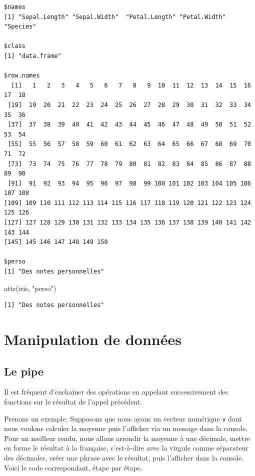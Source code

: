 \documentclass[
  letterpaper,
  DIV=11,
  numbers=noendperiod,
  oneside]{scrreprt}
\newenvironment{Shaded}{\begin{snugshade}}{\end{snugshade}}
\newcommand{\FunctionTok}[1]{\textcolor[rgb]{0.28,0.35,0.67}{#1}}
\newcommand{\NormalTok}[1]{\textcolor[rgb]{0.00,0.23,0.31}{#1}}
\newcommand{\StringTok}[1]{\textcolor[rgb]{0.13,0.47,0.30}{#1}}
\begin{document}
\begin{verbatim}
$names
[1] "Sepal.Length" "Sepal.Width"  "Petal.Length" "Petal.Width"  "Species"     

$class
[1] "data.frame"

$row.names
  [1]   1   2   3   4   5   6   7   8   9  10  11  12  13  14  15  16  17  18
 [19]  19  20  21  22  23  24  25  26  27  28  29  30  31  32  33  34  35  36
 [37]  37  38  39  40  41  42  43  44  45  46  47  48  49  50  51  52  53  54
 [55]  55  56  57  58  59  60  61  62  63  64  65  66  67  68  69  70  71  72
 [73]  73  74  75  76  77  78  79  80  81  82  83  84  85  86  87  88  89  90
 [91]  91  92  93  94  95  96  97  98  99 100 101 102 103 104 105 106 107 108
[109] 109 110 111 112 113 114 115 116 117 118 119 120 121 122 123 124 125 126
[127] 127 128 129 130 131 132 133 134 135 136 137 138 139 140 141 142 143 144
[145] 145 146 147 148 149 150

$perso
[1] "Des notes personnelles"
\end{verbatim}

\begin{Shaded}
\begin{Highlighting}[]
\FunctionTok{attr}\NormalTok{(iris, }\StringTok{"perso"}\NormalTok{)}
\end{Highlighting}
\end{Shaded}

\begin{verbatim}
[1] "Des notes personnelles"
\end{verbatim}

\part{\textbf{Manipulation de données}}

\hypertarget{sec-pipe}{%
\chapter{Le pipe}\label{sec-pipe}}

Il est fréquent d'enchainer des opérations en appelant successivement
des fonctions sur le résultat de l'appel précédent.

Prenons un exemple. Supposons que nous ayons un vecteur numérique
\texttt{v} dont nous voulons calculer la moyenne puis l'afficher via un
message dans la console. Pour un meilleur rendu, nous allons arrondir la
moyenne à une décimale, mettre en forme le résultat à la française,
c'est-à-dire avec la virgule comme séparateur des décimales, créer une
phrase avec le résultat, puis l'afficher dans la console. Voici le code
correspondant, étape par étape.
\end{document}
